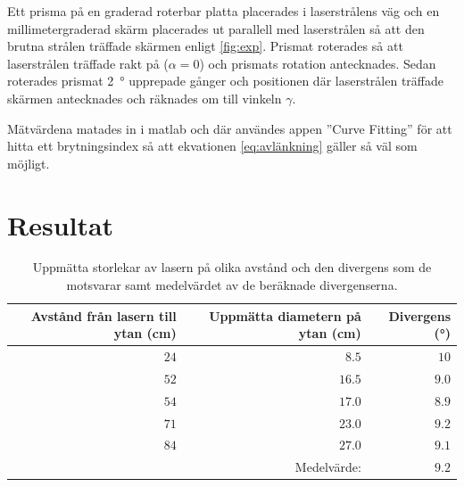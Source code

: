 \documentclass[a4paper]{article}
\begin{document}
  Ett prisma på en graderad roterbar platta placerades i laserstrålens väg och en millimetergraderad skärm placerades ut parallell med laserstrålen så att den brutna strålen träffade skärmen enligt \autoref{fig:exp}. Prismat roterades så att laserstrålen träffade rakt på ($\alpha=0$) och prismats rotation antecknades. Sedan roterades prismat \SI{2}{\degree} upprepade gånger och positionen där laserstrålen träffade skärmen antecknades och räknades om till vinkeln $\gamma$.
  
  Mätvärdena matades in i matlab och där användes appen ”Curve Fitting” för att hitta ett brytningsindex så att ekvationen \eqref{eq:avlänkning} gäller så väl som möjligt.

\section{Resultat}

\FloatBarrier

\begin{table}[h]
	\centering
	\caption{Uppmätta storlekar av lasern på olika avstånd och den divergens som de motsvarar samt medelvärdet av de beräknade divergenserna.}
	\label{tab:div}
	\begin{tabular}{|rrr|}%
		\hline
		Avstånd från lasern till ytan (\si{\centi\meter}) & Uppmätta diametern på ytan (\si{\centi\meter}) & Divergens (\si{\degree}) \\
		\hline
		$24$ & $8.5$ & $10$ \\
		$52$ & $16.5$ & $9.0$ \\
		$54$ & $17.0$ & $8.9$ \\
		$71$ & $23.0$ & $9.2$ \\
		$84$ & $27.0$ & $9.1$ \\\hline
		& Medelvärde: & $9.2$ \\\hline
	\end{tabular}
\end{table}
\end{document}
